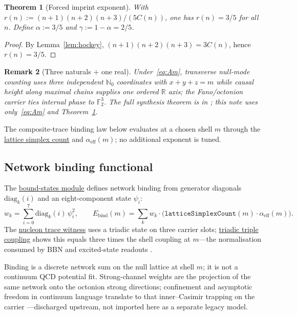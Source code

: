 \documentclass[11pt,notitlepage]{amsart}
\newtheorem{theorem}{Theorem}[section]
\newtheorem{remark}[theorem]{Remark}
\begin{document}
\begin{theorem}[Forced imprint exponent]\label{thm:alpha}
With $r(n):=(n+1)(n+2)(n+3)/(5C(n))$, one has $r(n)=3/5$ for all $n$. Define
$\alpha:=3/5$ and $\gamma:=1-\alpha=2/5$.
\end{theorem}

\begin{proof}
By Lemma~\ref{lem:hockey}, $(n+1)(n+2)(n+3)=3C(n)$, hence $r(n)=3/5$.
\end{proof}

\begin{remark}[Three naturals + one real]
Under~\eqref{eq:Am}, transverse null-mode counting uses three independent
$\mathbb{N}_0$ coordinates with $x+y+z=m$ while causal height along maximal chains
supplies one ordered $\mathbb{R}$ axis; the Fano/octonion carrier ties internal phase to
$\mathbb{F}_2^3$. The full synthesis theorem is in \cite{hqiv-3d-growth-paper}; this
note uses only~\eqref{eq:Am} and Theorem~\ref{thm:alpha}.
\end{remark}

The composite-trace binding law below evaluates at a chosen shell $m$ through the
\hyperref[lean:bound-states]{lattice simplex count} and
$\alpha_{\mathrm{eff}}(m)$; no additional exponent is tuned.

\subsection{Network binding functional}

The \hyperref[lean:bound-states]{bound-states module} defines network binding from
generator diagonals $\mathrm{diag}_k(i)$ and an eight-component state $\psi_i$:
\begin{equation}\label{eq:network-bind}
  w_k = \sum_{i=0}^{7} \mathrm{diag}_k(i)\,\psi_i^2,
  \qquad
  E_{\mathrm{bind}}(m) = \sum_k w_k \cdot
    \bigl(\texttt{latticeSimplexCount}(m)\cdot\alpha_{\mathrm{eff}}(m)\bigr).
\end{equation}
The \hyperref[lean:nucleon-trace-witness]{nucleon trace witness} uses a triadic
state on three carrier slots; \hyperref[lean:triple-coupling]{triadic triple coupling}
shows this equals three times the shell coupling at $m$---the normalisation consumed
by BBN and excited-state readouts \cite{hqiv-bbn-paper,hqiv-tuft-sm-lagrangian-paper}.

Binding is a discrete network sum on the null lattice at shell $m$; it is not a
continuum QCD potential fit. Strong-channel weights are the projection of the same
network onto the octonion strong directions; confinement and asymptotic freedom in
continuum language translate to that inner--Casimir trapping on the carrier
\cite{hqiv-gluon-curvature-note,hqiv-tuft-sm-lagrangian-paper}---discharged upstream,
not imported here as a separate legacy model.
\end{document}
